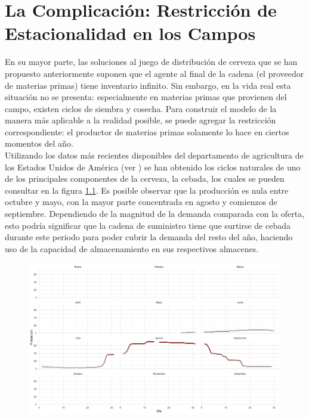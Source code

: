 \chapter{La Complicaci\'on: Restricci\'on de Estacionalidad en los Campos}

En su mayor parte, las soluciones al juego de distribuci\'on de cerveza que se han propuesto anteriormente suponen que el agente al final de la cadena (el proveedor de materias primas) tiene inventario infinito. Sin embargo, en la vida real esta situaci\'on no se presenta: especialmente en materias primas que provienen del campo, existen ciclos de siembra y cosecha. Para construir el modelo de la manera m\'as aplicable a la realidad posible, se puede agregar la restricci\'on correspondiente: el productor de materias primas solamente lo hace en ciertos momentos del a\~no.\\

Utilizando los datos m\'as recientes disponibles del departamento de agricultura de los Estados Unidos de Am\'erica (ver \citet{USDA}) se han obtenido los ciclos naturales de uno de los principales componentes de la cerveza, la cebada, los cuales se pueden consultar en la figura \ref{fields}. Es posible observar que la producci\'on es nula entre octubre y mayo, con la mayor parte concentrada en agosto y comienzos de septiembre. Dependiendo de la magnitud de la demanda comparada con la oferta, esto podr\'ia significar que la cadena de suministro tiene que surtirse de cebada durante este periodo para poder cubrir la demanda del resto del a\~no, haciendo uso de la capacidad de almacenamiento en sus respectivos almacenes.\\

\begin{figure}[ht!]
\caption{ }
\label{fields}
\includegraphics[width=13cm]{tesis_tex/figs/fields_monthly_supply_ggplot.png}
\centering
\end{figure}

